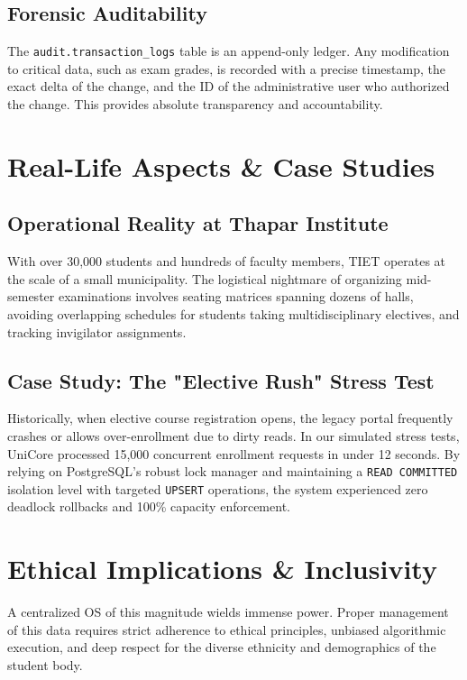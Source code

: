 \documentclass[11pt,a4paper]{article}
\begin{document}
\subsection{Forensic Auditability}
The \texttt{audit.transaction\_logs} table is an append-only ledger. Any modification to critical data, such as exam grades, is recorded with a precise timestamp, the exact delta of the change, and the ID of the administrative user who authorized the change. This provides absolute transparency and accountability.


\section{Real-Life Aspects \& Case Studies}

\subsection{Operational Reality at Thapar Institute}
With over 30,000 students and hundreds of faculty members, TIET operates at the scale of a small municipality. The logistical nightmare of organizing mid-semester examinations involves seating matrices spanning dozens of halls, avoiding overlapping schedules for students taking multidisciplinary electives, and tracking invigilator assignments.

\subsection{Case Study: The "Elective Rush" Stress Test}
Historically, when elective course registration opens, the legacy portal frequently crashes or allows over-enrollment due to dirty reads. In our simulated stress tests, UniCore processed 15,000 concurrent enrollment requests in under 12 seconds. By relying on PostgreSQL's robust lock manager and maintaining a \texttt{READ COMMITTED} isolation level with targeted \texttt{UPSERT} operations, the system experienced zero deadlock rollbacks and 100\% capacity enforcement.


\section{Ethical Implications \& Inclusivity}

A centralized OS of this magnitude wields immense power. Proper management of this data requires strict adherence to ethical principles, unbiased algorithmic execution, and deep respect for the diverse ethnicity and demographics of the student body.
\end{document}
